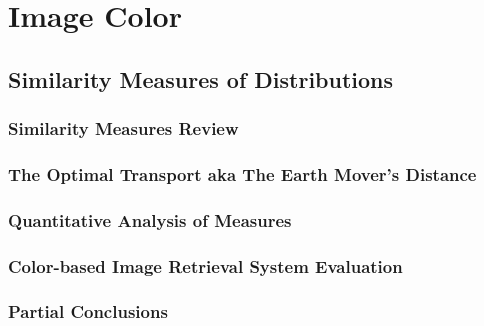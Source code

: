 \part{Image Color}
\chapter{Similarity Measures of Distributions}
\section{Similarity Measures Review}
\section{The Optimal Transport aka The Earth Mover's Distance}
\section{Quantitative Analysis of Measures}
\section{Color-based Image Retrieval System Evaluation}
\section{Partial Conclusions}




